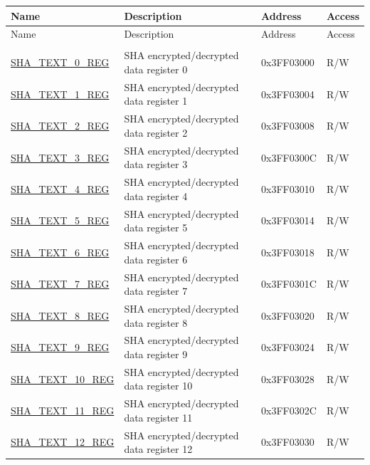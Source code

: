 \begin{longtable}{ | p{5cm} | p{7cm} | p{2cm} | p{1cm} | }
\hline\rowcolor{lightgray}
Name & Description &  Address & Access \\ \hline
\endfirsthead
        \hline
        \rowcolor{lightgray}
      Name & Description &  Address & Access \\
        \hline
        \endhead
        \endfoot
\multicolumn{4}{|l|}{\textbf{Encrypted/decrypted data registers}} \\ \hline
\hyperref[regdesc:SHATEXTnREG]{SHA\_TEXT\_0\_REG} & SHA encrypted/decrypted data register 0 & 0x3FF03000 & R/W \\ \hline
\hyperref[regdesc:SHATEXTnREG]{SHA\_TEXT\_1\_REG} & SHA encrypted/decrypted data register 1 & 0x3FF03004 & R/W \\ \hline
\hyperref[regdesc:SHATEXTnREG]{SHA\_TEXT\_2\_REG} & SHA encrypted/decrypted data register 2 & 0x3FF03008 & R/W \\ \hline
\hyperref[regdesc:SHATEXTnREG]{SHA\_TEXT\_3\_REG} & SHA encrypted/decrypted data register 3 & 0x3FF0300C & R/W \\ \hline
\hyperref[regdesc:SHATEXTnREG]{SHA\_TEXT\_4\_REG} & SHA encrypted/decrypted data register 4 & 0x3FF03010 & R/W \\ \hline
\hyperref[regdesc:SHATEXTnREG]{SHA\_TEXT\_5\_REG} & SHA encrypted/decrypted data register 5 & 0x3FF03014 & R/W \\ \hline
\hyperref[regdesc:SHATEXTnREG]{SHA\_TEXT\_6\_REG} & SHA encrypted/decrypted data register 6 & 0x3FF03018 & R/W \\ \hline
\hyperref[regdesc:SHATEXTnREG]{SHA\_TEXT\_7\_REG} & SHA encrypted/decrypted data register 7 & 0x3FF0301C & R/W \\ \hline
\hyperref[regdesc:SHATEXTnREG]{SHA\_TEXT\_8\_REG} & SHA encrypted/decrypted data register 8 & 0x3FF03020 & R/W \\ \hline
\hyperref[regdesc:SHATEXTnREG]{SHA\_TEXT\_9\_REG} & SHA encrypted/decrypted data register 9 & 0x3FF03024 & R/W \\ \hline
\hyperref[regdesc:SHATEXTnREG]{SHA\_TEXT\_10\_REG} & SHA encrypted/decrypted data register 10 & 0x3FF03028 & R/W \\ \hline
\hyperref[regdesc:SHATEXTnREG]{SHA\_TEXT\_11\_REG} & SHA encrypted/decrypted data register 11 & 0x3FF0302C & R/W \\ \hline
\hyperref[regdesc:SHATEXTnREG]{SHA\_TEXT\_12\_REG} & SHA encrypted/decrypted data register 12 & 0x3FF03030 & R/W \\ \hline

\end{longtable}

